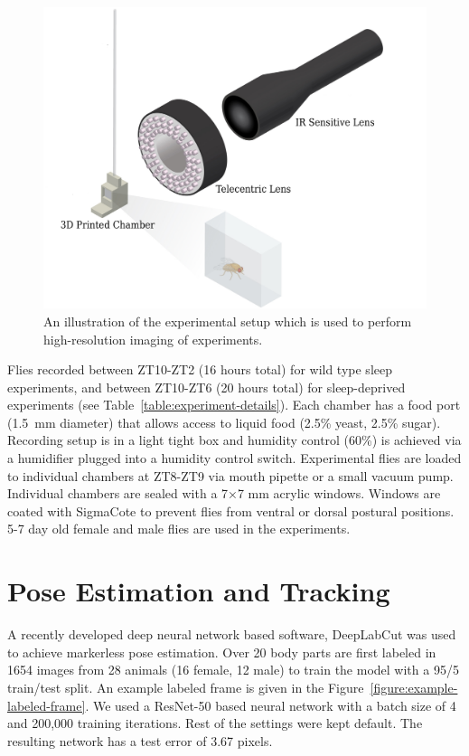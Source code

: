 \begin{figure}[htb!]
	\centering
	\includegraphics[width=0.8\linewidth]{figures/ExperimentalSetup.pdf}
	\caption[An illustration of the experimental setup which is used to perform high-resolution imaging of experiments.]{An illustration of the experimental setup which is used to perform high-resolution imaging of experiments.\label{figure:experiment-setup}}
\end{figure}

Flies recorded between ZT10-ZT2 (16 hours total) for wild type sleep experiments, and between ZT10-ZT6 (20 hours total) for sleep-deprived experiments (see Table~\ref{table:experiment-details}).
Each chamber has a food port (1.5 mm diameter) that allows access to liquid food (2.5\% yeast, 2.5\% sugar).
Recording setup is in a light tight box and humidity control (60\%) is achieved via a humidifier plugged into a humidity control switch.
Experimental flies are loaded to individual chambers at ZT8-ZT9 via mouth pipette or a small vacuum pump.
Individual chambers are sealed with a 7×7 mm acrylic windows.
Windows are coated with SigmaCote to prevent flies from ventral or dorsal postural positions.
5-7 day old female and male flies are used in the experiments.

\section{Pose Estimation and Tracking}
A recently developed deep neural network based software, DeepLabCut \citep{mathis_deeplabcut_2018} was used to achieve markerless pose estimation.
Over 20 body parts are first labeled in 1654 images from 28 animals (16 female, 12 male) to train the model with a 95/5 train/test split.
An example labeled frame is given in the Figure~\ref{figure:example-labeled-frame}.
We used a ResNet-50 \citep{he_deep_2016} based neural network with a batch size of 4 and 200,000 training iterations.
Rest of the settings were kept default.
The resulting network has a test error of 3.67 pixels.

